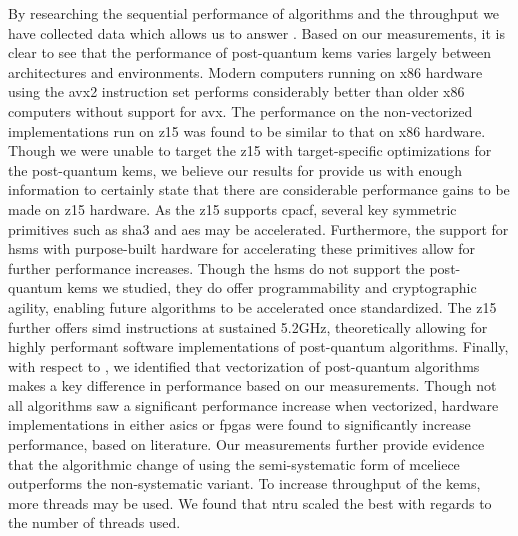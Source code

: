 
By researching the sequential performance of algorithms and the throughput we have collected data which allows us to answer . Based on our measurements, it is clear to see that the performance of \gls{post-quantum} \glspl{kem} varies largely between architectures and environments. Modern computers running on \gls{x86} hardware using the \gls{avx2} instruction set performs considerably better than older \gls{x86} computers without support for \gls{avx}. The performance on the non-vectorized implementations run on \gls{z15} was found to be similar to that on \gls{x86} hardware. Though we were unable to target the \gls{z15} with target-specific optimizations for the \gls{post-quantum} \glspl{kem}, we believe our results for  provide us with enough information to certainly state that there are considerable performance gains to be made on \gls{z15} hardware. As the \gls{z15} supports \gls{cpacf}, several key symmetric primitives such as \gls{sha3} and \gls{aes} may be accelerated. Furthermore, the support for \glspl{hsm} with purpose-built hardware for accelerating these primitives allow for further performance increases. Though the \glspl{hsm} do not support the \gls{post-quantum} \glspl{kem} we studied, they do offer programmability and cryptographic agility, enabling future algorithms to be accelerated once standardized. The \gls{z15} further offers \gls{simd} instructions at sustained 5.2GHz, theoretically allowing for highly performant software implementations of \gls{post-quantum} algorithms. Finally, with respect to , we identified that vectorization of \gls{post-quantum} algorithms makes a key difference in performance based on our measurements. Though not all algorithms saw a significant performance increase when vectorized, hardware implementations in either \glspl{asic} or \glspl{fpga} were found to significantly increase performance, based on literature. Our measurements further provide evidence that the algorithmic change of using the semi-systematic form of \gls{mceliece} outperforms the non-systematic variant. To increase throughput of the \glspl{kem}, more threads may be used. We found that \gls{ntru} scaled the best with regards to the number of threads used.


